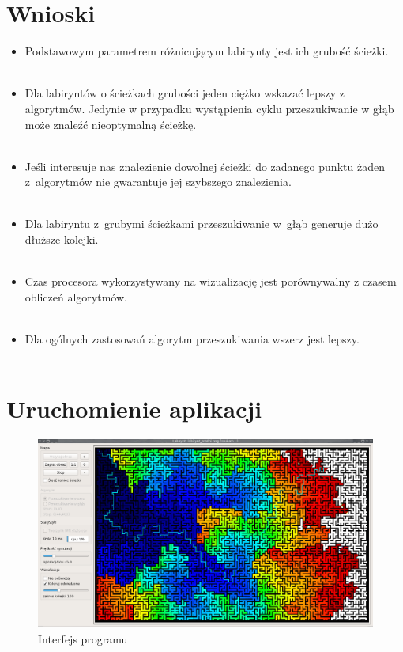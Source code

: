 \documentclass[11pt,a4paper,oneside]{mwart}
\begin{document}
\section{Wnioski}

\begin{itemize}
\item Podstawowym parametrem różnicującym labirynty jest ich grubość ścieżki.\\~
\item Dla labiryntów o ścieżkach grubości jeden ciężko wskazać lepszy z algorytmów. 
Jedynie w przypadku wystąpienia cyklu przeszukiwanie w głąb może znaleźć nieoptymalną ścieżkę.\\~
\item Jeśli interesuje nas znalezienie dowolnej ścieżki do zadanego punktu żaden 
z~algorytmów nie gwarantuje jej szybszego znalezienia.\\~
\item Dla labiryntu z~grubymi ścieżkami przeszukiwanie w~głąb generuje dużo dłuższe kolejki.\\~
\item Czas procesora wykorzystywany na wizualizację jest porównywalny z czasem obliczeń algorytmów.\\~
\item Dla ogólnych zastosowań algorytm przeszukiwania wszerz jest lepszy.\\~
\end{itemize}

\appendix

\section{Uruchomienie aplikacji\label{sec_uruchomienie}}
\begin{figure}[!h]
\centering
\includegraphics[angle=0,width=1\textwidth]{img/gui.png}
\caption{Interfejs programu\label{gui}}
\end{figure}
\end{document}
